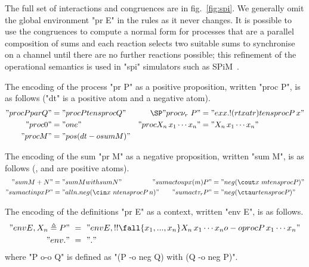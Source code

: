 \documentclass{article}
\begin{document}
The full set of interactions and congruences are in fig.~\ref{fig:spi}. We
generally omit the global environment "pr E" in the rules as it never changes.
It is possible to use the congruences to compute a normal form for processes
that are a parallel composition of sums and each reaction selects two suitable
sums to synchronise on a channel until there are no further reactions possible;
this refinement of the operational semantics is used in "spi" simulators such as
SPiM~\cite{phillips04bc}.

\bgroup \begin{defn} \mbox{} \label{defn:sencoding}
  \begin{ecom}[1.]
  \item The encoding of the process "pr P" as a positive proposition, written
    "proc P", is as follows ("dt" is a positive atom and \crt a negative atom).
    \begin{align*}
      "proc{P par Q}" &= "proc P tens proc Q"
      & \SP
      "proc {\nu_r\ P}" &= "ex x. ! (rt x at r) tens proc {P\,x}"
      \\
      "proc 0" &= "one"
      &
      "proc{X_n\,x_1 \cdots x_n}" &= "X_n\,x_1 \cdots x_n"
      \\
      "proc M" &= "pos {(dt -o sum M)}"
    \end{align*}
  \item The encoding of the sum "pr M" as a negative proposition, written "sum
    M", is as follows (,  and  are positive atoms).
    \begin{align*}
      "sum {M + N}" &= "sum M with sum N"
      &\hspace{-2em}
      "sum {act{oup x(m)} P}" &= "neg (\cout x~m tens proc P)"
      \\
      "sum {act{inp x} P}" &= "all n. neg (\cin x~n tens proc {P\,n})"
      &
      "sum {act{\tau_r} P}" &= "neg (\ctau r tens proc P)"
    \end{align*}
  \item The encoding of the definitions "pr E" as a context, written "env E", is
    as follows.
    \begin{align*}
      "env{E, X_n \triangleq P} " \ & = \ 
         "env{E}, !! \fall{x_1, ..., x_n} X_n\,x_1 \cdots x_n o-o proc{P\,x_1 \cdots x_n} " \\
      "env{ . } " \ & = \  " . " 
    \end{align*}
    where "P o-o Q" is defined as "(P -o neg Q) with (Q -o neg P)".
  \end{ecom}
\end{defn}
\egroup
\end{document}

